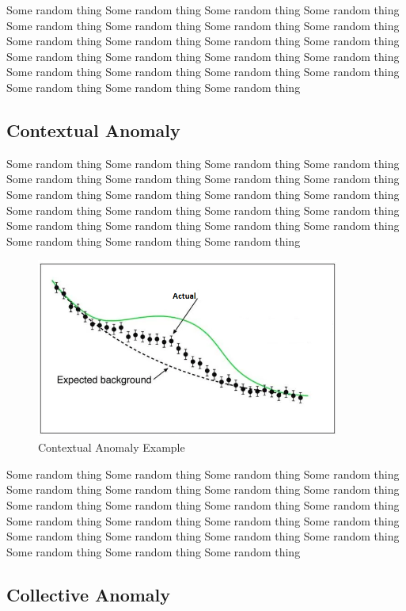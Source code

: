Some random thing Some random thing Some random thing Some random thing Some random thing Some random thing Some random thing Some random thing Some random thing Some random thing Some random thing Some random thing Some random thing Some random thing Some random thing Some random thing Some random thing Some random thing Some random thing Some random thing Some random thing Some random thing Some random thing  

\subsection{Contextual Anomaly}
Some random thing Some random thing Some random thing Some random thing Some random thing Some random thing Some random thing Some random thing Some random thing Some random thing Some random thing Some random thing Some random thing Some random thing Some random thing Some random thing Some random thing Some random thing Some random thing Some random thing Some random thing Some random thing Some random thing  
\begin{figure}[h]
	\centering
	\includegraphics[width=10cm]{texfiles/images/contextual outlier.png}
	\caption{Contextual Anomaly Example \protect \cite{ABriefOv32:online}}
	\label{fig:my_label}
\end{figure}


Some random thing Some random thing Some random thing Some random thing Some random thing Some random thing Some random thing Some random thing Some random thing Some random thing Some random thing Some random thing Some random thing Some random thing Some random thing Some random thing Some random thing Some random thing Some random thing Some random thing Some random thing Some random thing Some random thing  
\subsection{Collective Anomaly}


